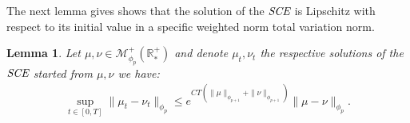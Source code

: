 \documentclass[11pt,a4paper]{article}
\newcommand{\RRP}{\mathbb{R}^+_*}
\newcommand{\MC}{\mathcal{M}}
\newcommand{\SCE}{\emph{SCE}}
\newcommand{\brac}[1]{\left\langle#1\right\rangle}
\newcommand{\dd}{\mathop{}\!\mathrm{d}}
\newtheorem{lemma}[theorem]{Lemma}
\begin{document}
The next lemma gives shows that the solution of the $\SCE$ is Lipschitz with respect to its initial value in a specific weighted norm total variation norm.
\begin{lemma}\label{lem:Lip-smol-TV}
    Let $\mu,\nu \in \MC^+_{\phi_p}(\RRP)$ and denote $\mu_t,\nu_t$ the respective solutions of the $\SCE$ started from $\mu,\nu$ we have:
    \begin{align*}
        \sup\limits_{t \in [0,T]}\| \mu_t - \nu_t\|_{\phi_p} \leq e^{CT\left(\|\mu\|_{\phi_{p+1}} + \|\nu\|_{\phi_{p+1}}\right)}\|\mu- \nu\|_{\phi_p}.
    \end{align*}
\end{lemma}
\end{document}
